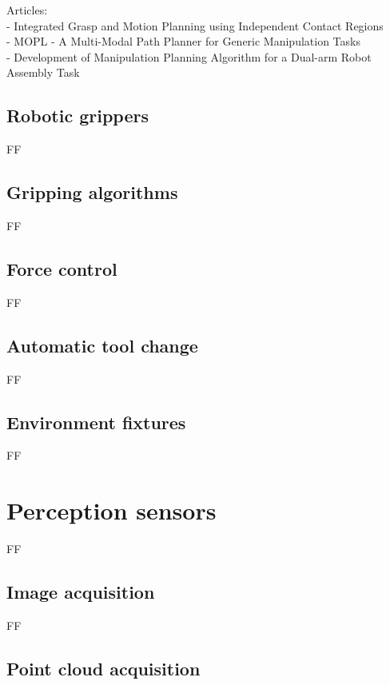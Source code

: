 Articles:\\
- Integrated Grasp and Motion Planning using Independent Contact Regions\\
- MOPL - A Multi-Modal Path Planner for Generic Manipulation Tasks\\
- Development of Manipulation Planning Algorithm for a Dual-arm Robot Assembly Task


\subsection{Robotic grippers}

FF


\subsection{Gripping algorithms}

FF


\subsection{Force control}

FF


\subsection{Automatic tool change}

FF


\subsection{Environment fixtures}

FF


\section{Perception sensors}

FF


\subsection{Image acquisition}\label{sec:image-acquisition}

FF


\subsection{Point cloud acquisition}\label{sec:point-cloud-acquisition}

